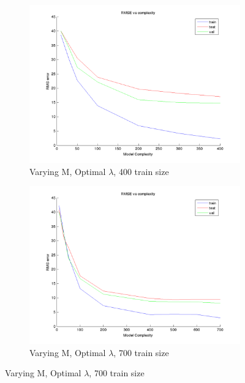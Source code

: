 \documentclass{article}
\begin{document}
\begin{figure}[H]

\begin{subfigure}{.5\textwidth}
\centering
\includegraphics[width=\linewidth]{D2/RMS_complexity_400}
\caption{Varying M, Optimal $\lambda$, 400 train size}
\end{subfigure}
\begin{subfigure}{.5\textwidth}
\includegraphics[width=\linewidth]{D2/RMS_complexity_700}
\caption{Varying M, Optimal $\lambda$, 700 train size}
\end{subfigure}



\end{figure}
\end{document}
